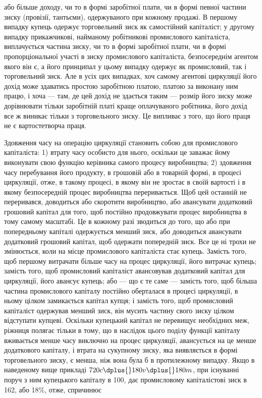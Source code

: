 \parcont{}  %
або більше доходу, чи то в формі заробітної плати, чи в формі
певної частини зиску (провізії, тантьєми), одержуваного при
кожному продажі. В першому випадку купець одержує торговельний
зиск як самостійний капіталіст; у другому випадку прикажчикові,
найманому робітникові промислового капіталіста, виплачується
частина зиску, чи то в формі заробітної плати, чи
в формі пропорціональної участі в зиску промислового капіталіста,
безпосереднім агентом якого він є, а його принципал
у цьому випадку одержує як промисловий, так і торговельний
зиск. Але в усіх цих випадках, хоч самому агентові циркуляції
його дохід може здаватись простою заробітною платою, платою
за виконану ним працю, і хоча — там, де цей дохід не здається
таким — розмір його зиску може дорівнювати тільки заробітній
платі краще оплачуваного робітника, його дохід все ж виникає
тільки з торговельного зиску. Це випливає з того, що його
праця не є вартостетворча праця.

Здовження часу на операцію циркуляції становить собою
для промислового капіталіста: 1) втрату часу особисто для нього,
оскільки це заважає йому виконувати свою функцію керівника
самого процесу виробництва; 2) здовження часу перебування
його продукту, в грошовій або в товарній формі, в процесі циркуляції,
отже, в такому процесі, в якому він не зростає в своїй
вартості і в якому безпосередній процес виробництва переривається.
Щоб цей останній не переривався, доводиться або
скоротити виробництво, або авансувати додатковий грошовий
капітал для того, щоб постійно продовжувати процес виробництва
в тому самому масштабі. Це в кожному разі зводиться
до того, що або при попередньому капіталі одержується менший
зиск, або доводиться авансувати додатковий грошовий
капітал, щоб одержати попередній зиск. Все це ні трохи не
змінюється, коли на місце промислового капіталіста стає купець.
Замість того, щоб першому витрачати більше часу на процес
циркуляції, його витрачає купець; замість того, щоб промисловий
капіталіст авансовував додатковий капітал для циркуляції,
його авансує купець; або — що є те саме — замість того,
щоб більша частина промислового капіталу постійно оберталася
в процесі циркуляції, в ньому цілком замикається капітал
купця; і замість того, щоб промисловий капіталіст одержував
менший зиск, він мусить частину свого зиску цілком відступати
купцеві. Оскільки купецький капітал не перевищує необхідних
меж, ріжниця полягає тільки в тому, що в наслідок
цього поділу функції капіталу вживається менше часу виключно
на процес циркуляції, авансується на це менше додаткового
капіталу, і втрата на сукупному зиску, яка виявляється в формі
торговельного зиску, є менша, ніж вона була б в протилежному
випадку. Якщо в наведеному вище прикладі $720c \dplus{} 180v \dplus{} 180m$,
при існуванні поруч з ним купецького капіталу в 100, дає промисловому
капіталістові зиск в 162, або 18\%, отже, спричинює
\parbreak{}  %
